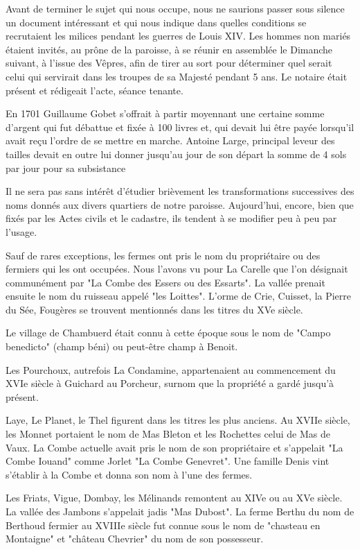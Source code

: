 Avant de terminer le sujet qui nous occupe, nous ne saurions passer sous silence un document intéressant et qui nous indique dans quelles conditions se recrutaient les milices pendant les guerres de Louis XIV. Les hommes non mariés étaient invités, au prône de la paroisse, à se réunir en assemblée le Dimanche suivant, à l'issue des Vêpres, afin de tirer au sort pour déterminer
quel serait celui qui servirait dans les troupes de sa Majesté pendant 5 ans. Le notaire était présent et rédigeait l'acte, séance tenante.

En 1701 Guillaume Gobet s'offrait à partir moyennant une certaine somme d'argent qui fut débattue et fixée à 100 livres et, qui devait lui être payée lorsqu'il avait reçu l'ordre de se mettre en marche. Antoine Large, principal leveur des tailles devait en outre lui donner jusqu'au jour de son départ la somme de 4 sols par jour pour sa subsistance

Il ne sera pas sans intérêt d'étudier brièvement les transformations successives des noms donnés aux divers quartiers de notre paroisse. Aujourd'hui, encore, bien que fixés par les Actes civils et le cadastre, ils tendent à se modifier peu à peu par l'usage.

Sauf de rares exceptions, les fermes ont pris le nom du propriétaire ou des fermiers qui les ont occupées. Nous l'avons vu pour La Carelle que l'on désignait communément par "La Combe des Essers ou des Essarts". La vallée prenait ensuite le nom du ruisseau appelé "les Loittes". L'orme de Crie, Cuisset, la Pierre du Sée, Fougères se trouvent mentionnés dans les titres du XVe siècle.

Le village de Chambuerd était connu à cette époque sous le nom de "Campo benedicto" (champ béni) ou peut-être champ à Benoit.

Les Pourchoux, autrefois La Condamine, appartenaient au commencement du XVIe siècle à Guichard au Porcheur, surnom que la propriété a gardé jusqu'à présent.

Laye, Le Planet, le Thel figurent dans les titres les plus anciens. Au XVIIe siècle, les Monnet portaient le nom de Mas Bleton et les Rochettes celui de Mas de Vaux. La Combe actuelle avait pris le nom de son propriétaire et s'appelait "La Combe Iouand" comme Jorlet "La Combe Genevret". Une famille Denis vint s'établir à la Combe et donna son nom à l'une des fermes.

Les Friats, Vigue, Dombay, les Mélinands remontent au XIVe ou au XVe siècle. La vallée des Jambons s'appelait jadis "Mas Dubost". La ferme Berthu du nom de Berthoud fermier au XVIIIe siècle fut
connue sous le nom de "chasteau en Montaigne" et "château Chevrier" du nom de son possesseur.

